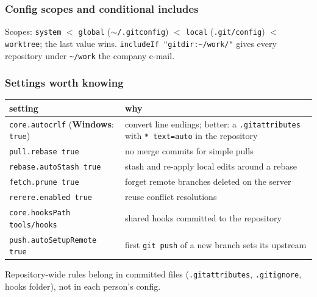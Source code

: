 \documentclass[aspectratio=169,10pt,compress]{beamer}
\newcommand{\win}{\textbf{Windows}}
\begin{document}




\begin{frame}[t,fragile] \frametitle{Config scopes and conditional includes}

  \vspace{0.1em}
  \small
  Scopes: \texttt{system} $<$ \texttt{global} ($\sim$\texttt{/.gitconfig}) $<$ \texttt{local} (\texttt{.git/config}) $<$ \texttt{worktree}; the last value wins.
  \texttt{includeIf "gitdir:\textasciitilde/work/"} gives every repository under \texttt{\textasciitilde/work} the company e-mail.
\end{frame}




\begin{frame}[t,fragile] \frametitle{Settings worth knowing}
  \begin{center}\small
  \begin{tabular}{lL{0.58\textwidth}}
    \toprule
    \textbf{setting}                         & \textbf{why} \\
    \midrule
    \texttt{core.autocrlf} (\win: \texttt{true}) & convert line endings; better: a \texttt{.gitattributes} with \texttt{* text=auto} in the repository \\
    \texttt{pull.rebase true}                & no merge commits for simple pulls \\
    \texttt{rebase.autoStash true}           & stash and re-apply local edits around a rebase \\
    \texttt{fetch.prune true}                & forget remote branches deleted on the server \\
    \texttt{rerere.enabled true}             & reuse conflict resolutions \\
    \texttt{core.hooksPath tools/hooks}      & shared hooks committed to the repository \\
    \texttt{push.autoSetupRemote true}       & first \texttt{git push} of a new branch sets its upstream \\
    \bottomrule
  \end{tabular}
  \end{center}
  \small Repository-wide rules belong in committed files (\texttt{.gitattributes}, \texttt{.gitignore}, hooks folder), not in each person's config.
\end{frame}
\end{document}
